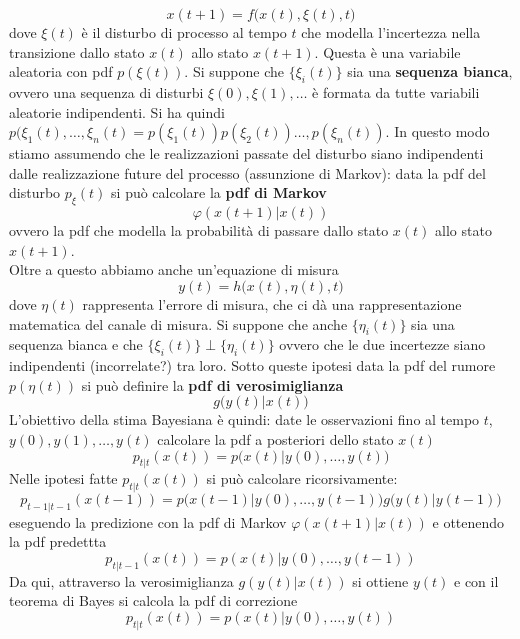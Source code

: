 \begin{equation}
x(t+1) = f \big ( x(t), \xi(t), t \big)
\end{equation} dove $\xi(t)$ \`e il disturbo di processo al tempo $t$ che modella l'incertezza nella transizione dallo stato $x(t)$ allo stato $x(t+1)$. Questa \`e una variabile aleatoria con pdf $p({\xi}(t))$. Si suppone che $\{\xi_i(t)\}$ sia una \textbf{sequenza bianca}, ovvero una sequenza di disturbi $\xi(0), \xi(1), \dots $ \`e formata da tutte variabili aleatorie indipendenti. Si ha quindi $p({\xi_1(t), \dots, \xi_n(t)} = p({\xi_1}(t)) p({\xi_2}(t)) \dots, p({\xi_n}(t))$. In questo modo stiamo assumendo che le realizzazioni passate del disturbo siano indipendenti dalle realizzazione future del processo (assunzione di Markov): data la pdf del disturbo $p_{\xi}(t)$ si pu\`o calcolare la \textbf{pdf di Markov}
\begin{equation}
\varphi (x(t+1) | x(t))
\end{equation} ovvero la pdf che modella la probabilit\`a di passare dallo stato $x(t)$ allo stato $x(t+1)$.\\
Oltre a questo abbiamo anche un'equazione di misura
\begin{equation}
y(t) = h \big ( x(t), \eta(t), t \big )
\end{equation} dove $\eta(t)$ rappresenta l'errore di misura, che ci d\`a una rappresentazione matematica del canale di misura. Si suppone che anche $\{\eta_i(t)\}$ sia una sequenza bianca e che $\{\xi_i(t)\} \perp \{\eta_i(t)\}$ ovvero che le due incertezze siano indipendenti (incorrelate?) tra loro.
Sotto queste ipotesi data la pdf del rumore $p({\eta}(t))$ si pu\`o definire la \textbf{pdf di verosimiglianza} 
\begin{equation}
g \big ( y(t)|x(t) \big )
\end{equation}
L'obiettivo della stima Bayesiana \`e quindi:
date le osservazioni fino al tempo $t$, $y(0), y(1), \dots, y(t)$ calcolare la pdf a posteriori dello stato $x(t)$
\begin{equation}
p_{t|t}(x(t)) = p \big ( x(t) | y(0), \dots, y(t) \big )
\end{equation} Nelle ipotesi fatte $p_{t|t}(x(t))$ si pu\`o calcolare ricorsivamente:
\begin{equation}
p_{t-1|t-1}(x(t-1)) = p \big ( x(t-1) | y(0), \dots, y(t-1) \big) g \big ( y(t)|y(t-1) \big )
\end{equation} eseguendo la predizione con la pdf di Markov $\varphi (x(t+1) | x(t))$ e ottenendo la pdf predettta
\begin{equation}
p_{t|t-1} (x(t)) = p(x(t)|y(0), \dots, y(t-1))
\end{equation}
Da qui, attraverso la verosimiglianza $g(y(t)|x(t))$ si ottiene $y(t)$ e con il teorema di Bayes si calcola la pdf di correzione
\begin{equation}
p_{t|t}(x(t)) = p(x(t)|y(0), \dots, y(t))
\end{equation}